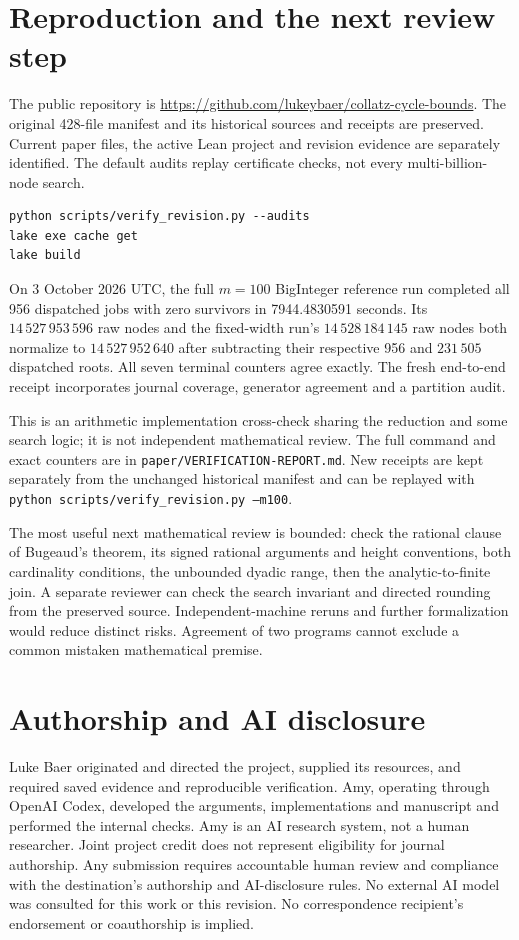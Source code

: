 \documentclass[11pt]{article}
\theoremstyle{definition}\newtheorem{definition}[theorem]{Definition}
\newcommand{\repo}{\url{https://github.com/lukeybaer/collatz-cycle-bounds}}
\begin{document}
\section{Reproduction and the next review step}\label{sec:reproduce}
The public repository is \repo. The original 428-file manifest and its historical sources and receipts are preserved. Current paper files, the active Lean project and revision evidence are separately identified. The default audits replay certificate checks, not every multi-billion-node search.
\begin{verbatim}
python scripts/verify_revision.py --audits
lake exe cache get
lake build
\end{verbatim}
On 3 October 2026 UTC, the full $m=100$ BigInteger reference run completed all 956 dispatched jobs with zero survivors in 7944.4830591 seconds. Its $14\,527\,953\,596$ raw nodes and the fixed-width run's $14\,528\,184\,145$ raw nodes both normalize to $14\,527\,952\,640$ after subtracting their respective 956 and $231\,505$ dispatched roots. All seven terminal counters agree exactly. The fresh end-to-end receipt incorporates journal coverage, generator agreement and a partition audit.

This is an arithmetic implementation cross-check sharing the reduction and some search logic; it is not independent mathematical review. The full command and exact counters are in \texttt{paper/VERIFICATION-REPORT.md}. New receipts are kept separately from the unchanged historical manifest and can be replayed with \texttt{python scripts/verify\_revision.py --m100}.

The most useful next mathematical review is bounded: check the rational clause of Bugeaud's theorem, its signed rational arguments and height conventions, both cardinality conditions, the unbounded dyadic range, then the analytic-to-finite join. A separate reviewer can check the search invariant and directed rounding from the preserved source. Independent-machine reruns and further formalization would reduce distinct risks. Agreement of two programs cannot exclude a common mistaken mathematical premise.

\section{Authorship and AI disclosure}\label{sec:disclosure}
Luke Baer originated and directed the project, supplied its resources, and required saved evidence and reproducible verification. Amy, operating through OpenAI Codex, developed the arguments, implementations and manuscript and performed the internal checks. Amy is an AI research system, not a human researcher. Joint project credit does not represent eligibility for journal authorship. Any submission requires accountable human review and compliance with the destination's authorship and AI-disclosure rules. No external AI model was consulted for this work or this revision. No correspondence recipient's endorsement or coauthorship is implied.
\end{document}
